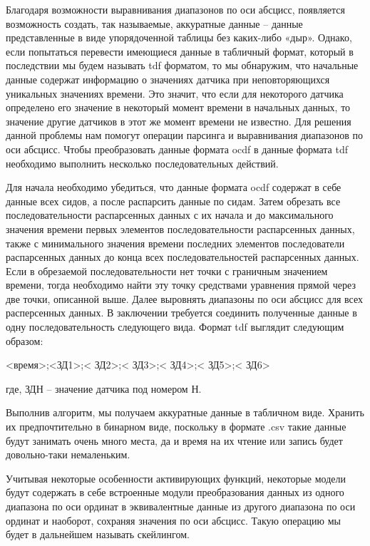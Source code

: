   \par \redline Благодаря возможности выравнивания диапазонов по оси абсцисс, появляется возможность создать, так называемые, аккуратные данные – данные представленные в виде упорядоченной таблицы без каких-либо «дыр». Однако, если попытаться перевести имеющиеся данные в табличный формат, который в последствии мы будем называть tdf форматом, то мы обнаружим, что начальные данные содержат информацию о значениях датчика при неповторяющихся уникальных значениях времени. Это значит, что если для некоторого датчика определено его значение в некоторый момент времени в начальных данных, то значение другие датчиков в этот же момент времени не известно. Для решения данной проблемы нам помогут операции парсинга и выравнивания диапазонов по оси абсцисс. Чтобы преобразовать данные формата ocdf в данные формата tdf необходимо выполнить несколько последовательных действий. 

  \par \redline Для начала необходимо убедиться, что данные формата ocdf содержат в себе данные всех сидов, а после распарсить данные по сидам. Затем обрезать все последовательности распарсенных данных с их начала и до максимального значения времени первых элементов последовательности распарсенных данных, также с минимального значения времени последних элементов последователи распарсенных данных до конца всех последовательностей распарсенных данных. Если в обрезаемой последовательности нет точки с граничным значением времени, тогда необходимо найти эту точку средствами уравнения прямой через две точки, описанной выше. Далее выровнять диапазоны по оси абсцисс для всех расперсенных данных. В заключении требуется соединить полученные данные в одну последовательность следующего вида. Формат tdf выглядит следующим образом:

  \begin{Center}
  <время>;<ЗД1>;< ЗД2>;< ЗД3>;< ЗД4>;< ЗД5>;< ЗД6>
  \end{Center}

  \par \redline где, ЗДН – значение датчика под номером Н. 

  \par \redline Выполнив алгоритм, мы получаем аккуратные данные в табличном виде. Хранить их предпочтительно в бинарном виде, поскольку в формате .csv такие данные будут занимать очень много места, да и время на их чтение или запись будет довольно-таки немаленьким. 

  \par \redline Учитывая некоторые особенности активирующих функций, некоторые модели будут содержать в себе встроенные модули преобразования данных из одного диапазона по оси ординат в эквивалентные данные из другого диапазона по оси ординат и наоборот, сохраняя значения по оси абсцисс. Такую операцию мы будет в дальнейшем называть скейлингом.

